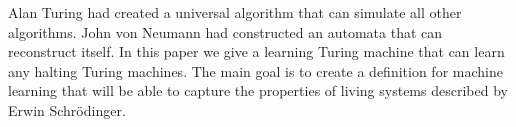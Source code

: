 Alan Turing had created a universal algorithm that can simulate all other algorithms. 
John von Neumann had constructed an automata that can reconstruct itself. 
In this paper we give a learning Turing machine that can learn any halting Turing machines. 
The main goal is to create a definition for machine learning that will be able to capture the properties of living systems described by Erwin Schrödinger.